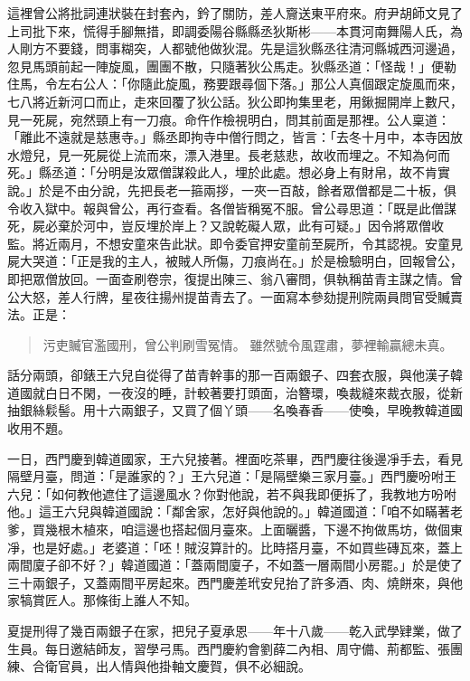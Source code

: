 這裡曾公將批詞連狀裝在封套內，鈐了關防，差人齎送東平府來。府尹胡師文見了上司批下來，慌得手腳無措，即調委陽谷縣縣丞狄斯彬——本貫河南舞陽人氏，為人剛方不要錢，問事糊突，人都號他做狄混。先是這狄縣丞往清河縣城西河邊過，忽見馬頭前起一陣旋風，團團不散，只隨著狄公馬走。狄縣丞道：「怪哉！」便勒住馬，令左右公人：「你隨此旋風，務要跟尋個下落。」那公人真個跟定旋風而來，七八將近新河口而止，走來回覆了狄公話。狄公即拘集里老，用鍬掘開岸上數尺，見一死屍，宛然頸上有一刀痕。命仵作檢視明白，問其前面是那裡。公人稟道：「離此不遠就是慈惠寺。」縣丞即拘寺中僧行問之，皆言：「去冬十月中，本寺因放水燈兒，見一死屍從上流而來，漂入港里。長老慈悲，故收而埋之。不知為何而死。」縣丞道：「分明是汝眾僧謀殺此人，埋於此處。想必身上有財帛，故不肯實說。」於是不由分說，先把長老一箍兩拶，一夾一百敲，餘者眾僧都是二十板，俱令收入獄中。報與曾公，再行查看。各僧皆稱冤不服。曾公尋思道：「既是此僧謀死，屍必棄於河中，豈反埋於岸上？又說乾礙人眾，此有可疑。」因令將眾僧收監。將近兩月，不想安童來告此狀。即令委官押安童前至屍所，令其認視。安童見屍大哭道：「正是我的主人，被賊人所傷，刀痕尚在。」於是檢驗明白，回報曾公，即把眾僧放回。一面查刷卷宗，復提出陳三、翁八審問，俱執稱苗青主謀之情。曾公大怒，差人行牌，星夜往揚州提苗青去了。一面寫本參劾提刑院兩員問官受贓賣法。正是：
\begin{quote}
污吏贓官濫國刑，曾公判刷雪冤情。
雖然號令風霆肅，夢裡輸贏總未真。
\end{quote}

話分兩頭，卻錶王六兒自從得了苗青幹事的那一百兩銀子、四套衣服，與他漢子韓道國就白日不閑，一夜沒的睡，計較著要打頭面，治簪環，喚裁縫來裁衣服，從新抽銀絲鬏髻。用十六兩銀子，又買了個丫頭——名喚春香——使喚，早晚教韓道國收用不題。

一日，西門慶到韓道國家，王六兒接著。裡面吃茶畢，西門慶往後邊凈手去，看見隔壁月臺，問道：「是誰家的？」王六兒道：「是隔壁樂三家月臺。」西門慶吩咐王六兒：「如何教他遮住了這邊風水？你對他說，若不與我即便拆了，我教地方吩咐他。」這王六兒與韓道國說：「鄰舍家，怎好與他說的。」韓道國道：「咱不如瞞著老爹，買幾根木植來，咱這邊也搭起個月臺來。上面曬醬，下邊不拘做馬坊，做個東凈，也是好處。」老婆道：「呸！賊沒算計的。比時搭月臺，不如買些磚瓦來，蓋上兩間廈子卻不好？」韓道國道：「蓋兩間廈子，不如蓋一層兩間小房罷。」於是使了三十兩銀子，又蓋兩間平房起來。西門慶差玳安兒抬了許多酒、肉、燒餅來，與他家犒賞匠人。那條街上誰人不知。

夏提刑得了幾百兩銀子在家，把兒子夏承恩——年十八歲——乾入武學肄業，做了生員。每日邀結師友，習學弓馬。西門慶約會劉薛二內相、周守備、荊都監、張團練、合衛官員，出人情與他掛軸文慶賀，俱不必細說。

